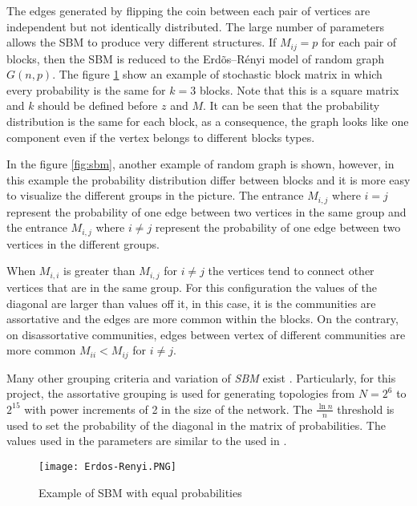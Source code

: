 The edges generated by flipping the coin between each pair of vertices are independent but not identically distributed. The large number of parameters allows the SBM  to produce very different structures. If $M_{ij} = p$ for each pair of blocks, then the SBM is reduced to the Erd\~os--R\'enyi model of random graph $G(n,p)$. The figure \ref{fig:erdos} show an example of stochastic block matrix in which every probability is the same for $k = 3$ blocks. Note that this is a square matrix and $k$ should be defined before $z$ and $M$. It can be seen that the probability distribution is the same for each block, as a consequence, the graph looks like one component even if the vertex belongs to different blocks types.

 In the figure \ref{fig:sbm}, another example of random graph is shown, however, in this example the probability distribution differ between blocks and it is more easy to visualize the different groups in the picture. The entrance $M_{i,j}$ where $i = j$ represent the probability of one edge between two vertices in the same group and the entrance $M_{i,j}$ where $i \neq j$ represent the probability of one edge between two vertices in the different groups. 

When $M_{i,i}$ is greater than $M_{i,j}$ for $i \neq j$ the vertices tend to connect other vertices that are in the same group. For this configuration the values of the diagonal are larger than values off it, in this case, it is the communities are assortative and the edges are more common within the blocks. On the contrary, on disassortative communities, edges between vertex of different communities are more common $M_{ii} <  M_{ij}$ for $i \neq j$.


Many other grouping criteria and variation of \textit{SBM} exist \cite{carrington2005models,holland1983stochastic,airoldi2008mixed}. Particularly, for this project, the assortative grouping is used for generating topologies from $N = 2^{6}$ to $2^{15}$ with power increments of 2 in the size of the network. The ${\tfrac {\ln n}{n}}$ threshold is used to set the probability of the diagonal in the matrix of probabilities. The values used in the parameters are similar to the used in \cite{kothapalli2013analysis}. 




\begin{figure}[ht]
\centering
\texttt{[image: Erdos-Renyi.PNG]} 
\caption{Example of SBM with equal probabilities}
\label{fig:erdos}
\end{figure}

